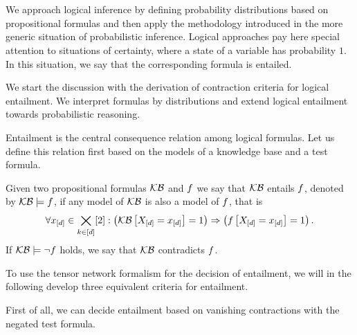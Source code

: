 \chapter{\chatextlogicalReasoning}\label{cha:logicalReasoning}

We approach logical inference by defining probability distributions based on propositional formulas and then apply the methodology introduced in the more generic situation of probabilistic inference.
Logical approaches pay here special attention to situations of certainty, where a state of a variable has probability $1$.
In this situation, we say that the corresponding formula is entailed.

We start the discussion with the derivation of contraction criteria for logical entailment.
We interpret formulas by distributions and extend logical entailment towards probabilistic reasoning.


Entailment is the central consequence relation among logical formulas.
Let us define this relation first based on the models of a knowledge base and a test formula.

\begin{definition}\label{def:logicalEntailment}
	Given two propositional formulas $\mathcal{KB}$ and $f$ we say that $\mathcal{KB}$ entails $f$, denoted by $\mathcal{KB}\models f$, if any model of $\mathcal{KB}$ is also a model of $f$, that is
	\begin{align*}
		\forall{x_{[d]}\in\bigtimes_{k\in[d]}[2]}:{\left(\mathcal{KB}\left[X_{[d]}=x_{[d]}\right]=1\right)\Rightarrow\left(f\left[X_{[d]}=x_{[d]}\right]=1\right)} \, .
	\end{align*}
	If $\mathcal{KB}\models\lnot f$ holds, we say that $\mathcal{KB}$ contradicts $f$.
\end{definition}

To use the tensor network formalism for the decision of entailment, we will in the following develop three equivalent criteria for entailment. %


First of all, we can decide entailment based on vanishing contractions with the negated test formula.

